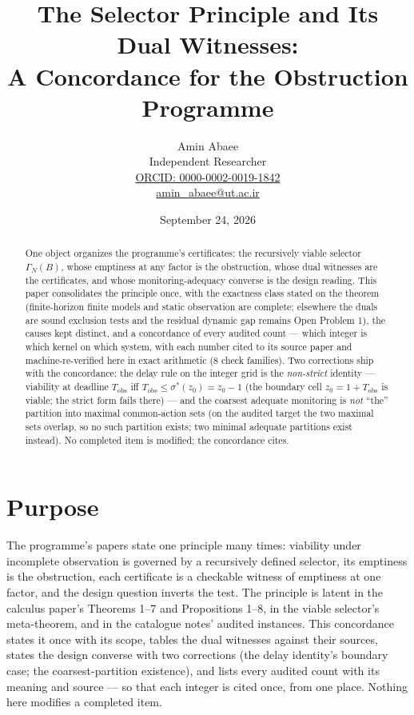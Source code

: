 \documentclass[10pt,twocolumn]{article}
\theoremstyle{definition}
\begin{document}
\title{The Selector Principle and Its Dual Witnesses:\\ A Concordance for the Obstruction Programme}
\author{Amin Abaee\\[0.35em]
{\small Independent Researcher}\\[0.55em]
{\small\href{https://orcid.org/0000-0002-0019-1842}{ORCID: 0000-0002-0019-1842}}\\[0.3em]
{\small\href{mailto:amin\_abaee@ut.ac.ir}{amin\_abaee@ut.ac.ir}}}
\date{September 24, 2026}
\maketitle

\begin{abstract}
One object organizes the programme's certificates: the recursively viable
selector $\Gamma_N(B)$, whose emptiness at any factor is the obstruction,
whose dual witnesses are the certificates, and whose monitoring-adequacy
converse is the design reading. This paper consolidates the principle once,
with the exactness class stated on the theorem (finite-horizon finite
models and static observation are complete; elsewhere the duals are sound
exclusion tests and the residual dynamic gap remains Open Problem 1), the
causes kept distinct, and a concordance of every audited count --- which
integer is which kernel on which system, with each number cited to its
source paper and machine-re-verified here in exact arithmetic (8 check
families). Two corrections ship with the concordance: the delay rule on
the integer grid is the \emph{non-strict} identity --- viability at
deadline $T_{\mathrm{obs}}$ iff $T_{\mathrm{obs}} \le \sigma^{*}(z_0) =
z_0 - 1$ (the boundary cell $z_0 = 1 + T_{\mathrm{obs}}$ is viable; the
strict form fails there) --- and the coarsest adequate monitoring is
\emph{not} ``the'' partition into maximal common-action sets (on the
audited target the two maximal sets overlap, so no such partition exists;
two minimal adequate partitions exist instead). No completed item is
modified; the concordance cites.
\end{abstract}

\section{Purpose}

The programme's papers state one principle many times: viability under
incomplete observation is governed by a recursively defined selector, its
emptiness is the obstruction, each certificate is a checkable witness of
emptiness at one factor, and the design question inverts the test. The
principle is latent in the calculus paper's Theorems 1--7 and
Propositions 1--8, in the viable selector's meta-theorem, and in the
catalogue notes' audited instances. This concordance states it once with
its scope, tables the dual witnesses against their sources, states the
design converse with two corrections (the delay identity's boundary case;
the coarsest-partition existence), and lists every audited count with its
meaning and source --- so that each integer is cited once, from one
place. Nothing here modifies a completed item.
\end{document}
